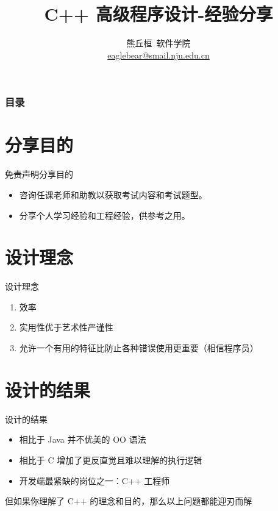 \documentclass[10pt,aspectratio=169,mathserif]{beamer}
\title{C++ 高级程序设计-经验分享}
\author[熊丘桓]{
    熊丘桓\ 软件学院\\
  {\small \url{eaglebear@smail.nju.edu.cn}}}
\date{\displaydate{displayday}}
\begin{document}
\begin{frame}
	\titlepage
\end{frame}

\begin{frame}
	\frametitle{目录}
	\tableofcontents
\end{frame}

\section{分享目的}
\begin{frame}{\sout{免责声明}分享目的}
	\begin{itemize}
		\item 咨询任课老师和助教以获取考试内容和考试题型。
		\item 分享个人学习经验和工程经验，供参考之用。
	\end{itemize}
\end{frame}

\section{设计理念}
\begin{frame}{设计理念}
	\begin{enumerate}
		\def\labelenumi{\arabic{enumi}.}
		\item
		      效率
		\item
		      实用性优于艺术性严谨性
		\item
		      允许一个有用的特征比防止各种错误使用更重要（相信程序员）
	\end{enumerate}
\end{frame}

\section{设计的结果}
\begin{frame}{设计的结果}
	\begin{itemize}
		\item
		      相比于 Java 并不优美的 OO 语法
		\item
		      相比于 C 增加了更反直觉且难以理解的执行逻辑
		\item
		      开发端最紧缺的岗位之一：C++ 工程师
	\end{itemize}

	但如果你理解了 C++ 的理念和目的，那么以上问题都能迎刃而解

\end{frame}
\end{document}
